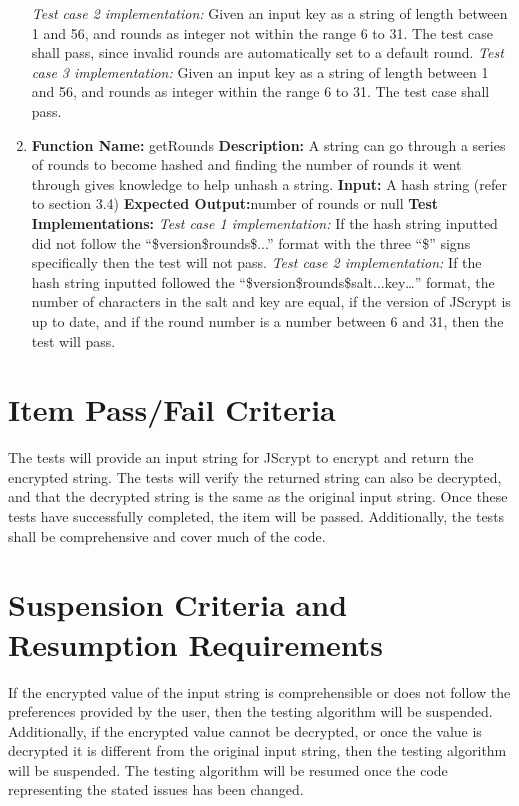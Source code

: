\documentclass[12pt]{article}
\begin{document}
\begin{enumerate}
  \textit{Test case 2 implementation:} Given an input key as a string of length between 1 and 56, and rounds as integer not within the range 6 to 31. The test case shall pass, since invalid rounds are automatically set to a default round. \newline
  \textit{Test case 3 implementation:} Given an input key as a string of length between 1 and 56, and rounds as integer within the range 6 to 31. The test case shall pass. \newline
  \item
  \textbf{Function Name:} getRounds \newline
  \textbf{Description:} A string can go through a series of rounds to become hashed and finding the number of rounds it went through gives knowledge to help unhash a string. \newline
  \textbf{Input:} A hash string (refer to section 3.4) \newline
  \textbf{Expected Output:}number of rounds or null \newline
  \textbf{Test Implementations:} \newline
  \textit{Test case 1 implementation:} If the hash string inputted did not follow the “\$version\$rounds\$...” format with the three “\$” signs specifically then the test will not pass. \newline
  \textit{Test case 2 implementation:} If the hash string inputted followed the “\$version\$rounds\$salt...key…” format, the number of characters in the salt and key are equal, if the version of JScrypt is up to date, and if the round number is a number between 6 and 31, then the test will pass. \newline

  \end{enumerate}
\section{Item Pass/Fail Criteria}
The tests will provide an input string for JScrypt to encrypt and return the encrypted string. The tests will verify the returned string can also be decrypted, and that the decrypted string is the same as the original input string. Once these tests have successfully completed, the item will be passed. Additionally, the tests shall be comprehensive and cover much of the code.

\section{Suspension Criteria and Resumption Requirements}
If the encrypted value of the input string is comprehensible or does not follow the preferences provided by the user, then the testing algorithm will be suspended. Additionally, if the encrypted value cannot be decrypted, or once the value is decrypted it is different from the original input string, then the testing algorithm will be suspended.
The testing algorithm will be resumed once the code representing the stated issues has been changed.
\end{document}
